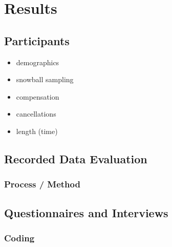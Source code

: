 \section{Results}\label{sec:results}

\subsection{Participants}

\begin{itemize}
    \item demographics
    \item snowball sampling
    \item compensation
    \item cancellations
    \item length (time)
\end{itemize}

\subsection{Recorded Data Evaluation}

\subsubsection{Process / Method}

\subsection{Questionnaires and Interviews}

\subsubsection{Coding}

